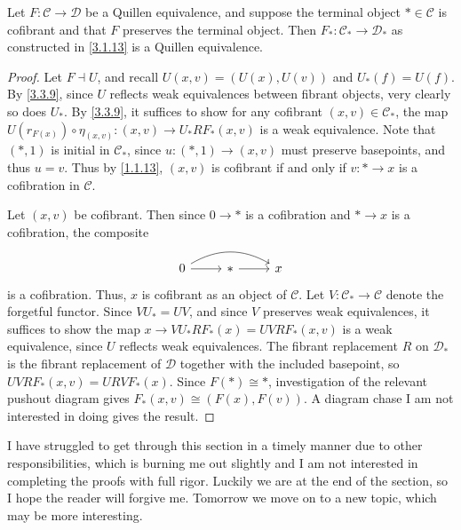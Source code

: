 \begin{proposition}\label{3.3.10}
	Let $F : \mathcal{C}  \to \mathcal{D}$ be a Quillen equivalence, and suppose the terminal object $*\in \mathcal{C} $ is cofibrant and that $F$ preserves the terminal object. Then $F_*: \mathcal{C} _* \to \mathcal{D} _*$ as constructed in \cref{3.1.13} is a Quillen equivalence.
\end{proposition}
\begin{proof}
	Let $F\dashv U$, and recall $U(x,v)=(U(x),U(v))$ and $U_*(f)=U(f)$. By \cref{3.3.9}, since $U$ reflects weak equivalences between fibrant objects, very clearly so does $U_*$. By \cref{3.3.9}, it suffices to show for any cofibrant $(x,v)\in \mathcal{C} _*$, the map $U(r_{F(x)} )\circ \eta_{(x,v)}  : (x,v) \to U_*RF_*(x,v)$ is a weak equivalence. Note that $(*,1)$ is initial in $\mathcal{C} _*$, since $u : (*,1) \to (x,v)$ must preserve basepoints, and thus $u=v$. Thus by \cref{1.1.13}, $(x,v)$ is cofibrant if and only if $v : * \to x$ is a cofibration in $\mathcal{C} $.

	Let $(x,v)$ be cofibrant. Then since $0\to *$ is a cofibration and $*\to x$ is a cofibration, the composite
	\[\begin{tikzcd}[row sep = 2.5em, column sep = 2.5em]
	0 \ar[bend left, rr] \ar[r]  & *\ar[r]  & x
	\end{tikzcd}\]
	is a cofibration. Thus, $x$ is cofibrant as an object of $\mathcal{C} $. Let $V : \mathcal{C} _* \to \mathcal{C} $ denote the forgetful functor. Since $VU_*=UV$, and since $V$ preserves weak equivalences, it suffices to show the map $x\to VU_*RF_*(x)=UVRF_*(x,v)$ is a weak equivalence, since $U$ reflects weak equivalences. The fibrant replacement $R$ on $\mathcal{D} _*$ is the fibrant replacement of $\mathcal{D} $ together with the included basepoint, so $UVRF_*(x,v)=URVF_*(x)$. Since $F(*)\cong *$, investigation of the relevant pushout diagram gives $F_*(x,v)\cong (F(x),F(v))$. A diagram chase I am not interested in doing gives the result.
\end{proof}

\begin{remark}\label{3.3.11}
	I have struggled to get through this section in a timely manner due to other responsibilities, which is burning me out slightly and I am not interested in completing the proofs with full rigor. Luckily we are at the end of the section, so I hope the reader will forgive me. Tomorrow we move on to a new topic, which may be more interesting.
\end{remark}

